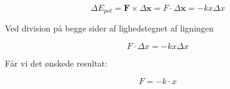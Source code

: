 \bigskip

\begin{equation}
\Delta E_{pot} = \textbf{F} \times \Delta \textbf{x} = F \cdot \Delta \textbf{x} = -kx \Delta x
\end{equation}

\bigskip

Ved division på begge sider af lighedstegnet af ligningen 

\bigskip

\begin{equation}
F \cdot \Delta x = -kx \Delta x
\end{equation}

\bigskip

Får vi det ønskede resultat: 

\bigskip

\begin{equation}
F = -k \cdot x
\end{equation}